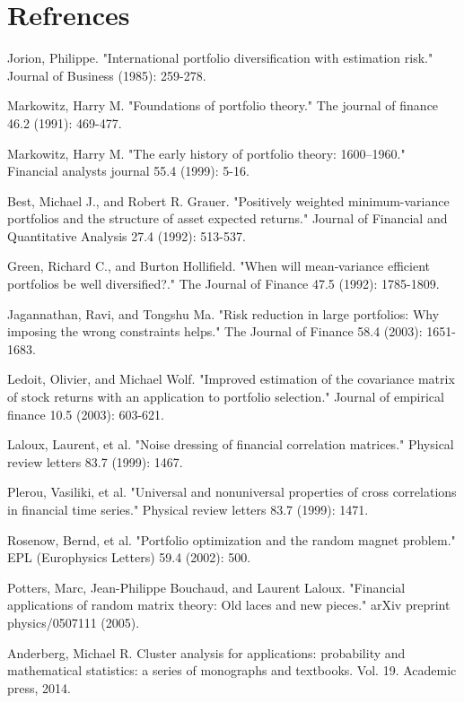 \documentclass[ aip,jmp,reprint]{revtex4-2}
\begin{document}
\section{Refrences}
\begin{thebibliography}{99}
 Jorion, Philippe. "International portfolio diversification with estimation risk." Journal of Business (1985): 259-278.

Markowitz, Harry M. "Foundations of portfolio theory." The journal of finance 46.2 (1991): 469-477.

 Markowitz, Harry M. "The early history of portfolio theory: 1600–1960." Financial analysts journal 55.4 (1999): 5-16.

 Best, Michael J., and Robert R. Grauer. "Positively weighted minimum-variance portfolios and the structure of asset expected returns." Journal of Financial and Quantitative Analysis 27.4 (1992): 513-537.

 Green, Richard C., and Burton Hollifield. "When will mean‐variance efficient portfolios be well diversified?." The Journal of Finance 47.5 (1992): 1785-1809.

 Jagannathan, Ravi, and Tongshu Ma. "Risk reduction in large portfolios: Why imposing the wrong constraints helps." The Journal of Finance 58.4 (2003): 1651-1683.

 Ledoit, Olivier, and Michael Wolf. "Improved estimation of the covariance matrix of stock returns with an application to portfolio selection." Journal of empirical finance 10.5 (2003): 603-621.

 Laloux, Laurent, et al. "Noise dressing of financial correlation matrices." Physical review letters 83.7 (1999): 1467.

 Plerou, Vasiliki, et al. "Universal and nonuniversal properties of cross correlations in financial time series." Physical review letters 83.7 (1999): 1471.

 Rosenow, Bernd, et al. "Portfolio optimization and the random magnet problem." EPL (Europhysics Letters) 59.4 (2002): 500.

 Potters, Marc, Jean-Philippe Bouchaud, and Laurent Laloux. "Financial applications of random matrix theory: Old laces and new pieces." arXiv preprint physics/0507111 (2005).

 Anderberg, Michael R. Cluster analysis for applications: probability and mathematical statistics: a series of monographs and textbooks. Vol. 19. Academic press, 2014.


\end{thebibliography}
\end{document}
